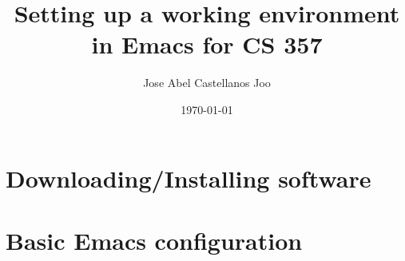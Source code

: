 



\title{Setting up a working environment in Emacs for CS 357}
\author{Jose Abel Castellanos Joo}
\date{\today} 

\frame{\titlepage} 

\section{Downloading/Installing software}




\section{Basic Emacs configuration}




